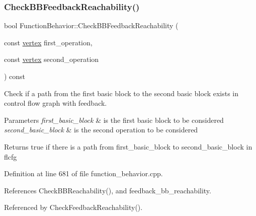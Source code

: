 \subsubsection{\texorpdfstring{Check\+B\+B\+Feedback\+Reachability()}{CheckBBFeedbackReachability()}}
{\footnotesize\ttfamily bool Function\+Behavior\+::\+Check\+B\+B\+Feedback\+Reachability (\begin{DoxyParamCaption}\item[{const \hyperlink{graph_8hpp_abefdcf0544e601805af44eca032cca14}{vertex}}]{first\+\_\+operation,  }\item[{const \hyperlink{graph_8hpp_abefdcf0544e601805af44eca032cca14}{vertex}}]{second\+\_\+operation }\end{DoxyParamCaption}) const}



Check if a path from the first basic block to the second basic block exists in control flow graph with feedback. 


\begin{DoxyParams}{Parameters}
{\em first\+\_\+basic\+\_\+block} & is the first basic block to be considered \\
\hline
{\em second\+\_\+basic\+\_\+block} & is the second operation to be considered \\
\hline
\end{DoxyParams}
\begin{DoxyReturn}{Returns}
true if there is a path from first\+\_\+basic\+\_\+block to second\+\_\+basic\+\_\+block in flcfg 
\end{DoxyReturn}


Definition at line 681 of file function\+\_\+behavior.\+cpp.



References Check\+B\+B\+Reachability(), and feedback\+\_\+bb\+\_\+reachability.



Referenced by Check\+Feedback\+Reachability().

